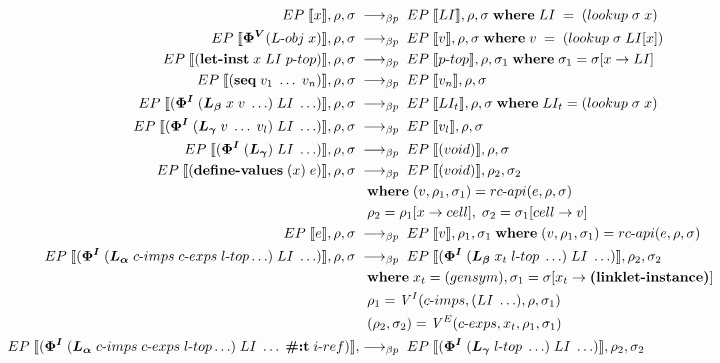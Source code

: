 \documentclass[sigplan,screen,anonymous]{acmart}
\def\dash {\text{-}}
\begin{document}
\begin{figure*}[tbp]
  \begin{align*}
    \redinput{x} \rel \redoutput{LI}{\rho}{\sigma} \where LI \; =\; (lookup\; \sigma\; x) \\
    \redinput{\bm{\Phi^V}(L\dash obj\; x)} \rel \redoutput{v}{\rho}{\sigma} \where v\; =\; (lookup\; \sigma\; LI[x]) \\
    \redinput{(\textbf{let\dash inst}\; x\; LI\; p\dash top)} \rel \redoutput{p\dash top}{\rho}{\sigma_1} \where \sigma_1 = \sigma[x\rightarrow LI] \\
    \redinput{(\textbf{seq}\; v_{1}\; \ldots\; v_{n})} \rel \redoutput{v_{n}}{\rho}{\sigma} \\
    \redinput{(\bm{\Phi^I}\; (\lb\; x\; v\; \ldots)\; LI\; \ldots)} \rel \redoutput{LI_t}{\rho}{\sigma} \where LI_t = (lookup\; \sigma\; x) \\
    \redinput{(\bm{\Phi^I}\; (\lc\; v\; \ldots\; v_{l})\; LI\; \ldots)} \rel \redoutput{v_{l}}{\rho}{\sigma} \\
    \redinput{(\bm{\Phi^I}\; (\lc)\; LI\; \ldots)} \rel \redoutput{(void)}{\rho}{\sigma} \\
    \redinput{(\textbf{define\dash values}\; (x)\; e)} \rel \redoutput{(void)}{\rho_2}{\sigma_2} \\
    \;          &\;\; \where (v,\rho_1,\sigma_1) = rc\dash api(e,\rho,\sigma) \\
    \;          &\;\; \rho_2 = \rho_1[x\rightarrow cell],\; \sigma_2 = \sigma_1[cell\rightarrow v]  \\
    \redinput{e} \rel \redoutput{v}{\rho_1}{\sigma_1} \where (v,\rho_1,\sigma_1) = rc\dash api(e,\rho,\sigma) \\
    \redinput{(\bm{\Phi^I}\; (\la\; c\dash imps \; c\dash exps \; l\dash top \ldots)\; LI\; \ldots)} \rel \redoutput{(\bm{\Phi^I}\; (\lb\; x_t\; l\dash top\; \ldots)\; LI\; \ldots)}{\rho_2}{\sigma_2} \\
    \;          &\;\; \where x_t = (gensym),  \sigma_1 = \sigma[x_t\rightarrow \textbf{(linklet-instance)}] \\
    \;          &\;\; \rho_1 = \mathit{V}^I(c\dash imps, (LI\; \ldots), \rho, \sigma_1) \\
    \;          &\;\; (\rho_2, \sigma_2) = \mathit{V}^E(c\dash exps, x_t, \rho_1, \sigma_1) \\
    EP\;\llbracket (\bm{\Phi^I}\; (\la\; c\dash imps \; c\dash exps \; l\dash top \ldots)\; LI\; \ldots\; \textbf{\#:t}\; i\dash ref) \rrbracket, \rel \redoutput{(\bm{\Phi^I}\; (\lc\; l\dash top\; \ldots)\; LI\; \ldots)}{\rho_2}{\sigma_2} \\

\end{align*}
\end{figure*}
\end{document}
